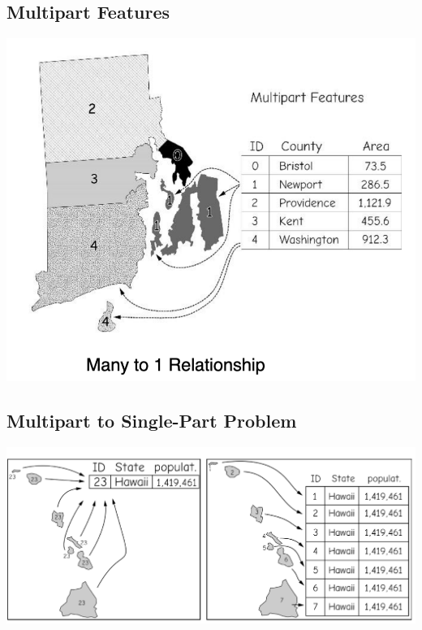 \documentclass[11pt]{article}
\theoremstyle{definition}
\begin{document}
\subsection{Multipart Features}
\includegraphics[width=\textwidth/2]{24.png}

\subsection{Multipart to Single-Part Problem}
\includegraphics[width=\textwidth/2]{25.png}
\end{document}
